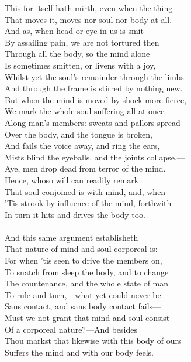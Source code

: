 This for itself hath mirth, even when the thing\\
That moves it, moves nor soul nor body at all.\\
And as, when head or eye in us is smit\\
By assailing pain, we are not tortured then\\
Through all the body, so the mind alone\\
Is sometimes smitten, or livens with a joy,\\
Whilst yet the soul's remainder through the limbs\\
And through the frame is stirred by nothing new.\\
But when the mind is moved by shock more fierce,\\
We mark the whole soul suffering all at once\\
Along man's members: sweats and pallors spread\\
Over the body, and the tongue is broken,\\
And fails the voice away, and ring the ears,\\
Mists blind the eyeballs, and the joints collapse,—\\
Aye, men drop dead from terror of the mind.\\
Hence, whoso will can readily remark\\
That soul conjoined is with mind, and, when\\
'Tis strook by influence of the mind, forthwith\\
In turn it hits and drives the body too.\\
\\
And this same argument establisheth\\
That nature of mind and soul corporeal is:\\
For when 'tis seen to drive the members on,\\
To snatch from sleep the body, and to change\\
The countenance, and the whole state of man\\
To rule and turn,—what yet could never be\\
Sans contact, and sans body contact fails—\\
Must we not grant that mind and soul consist\\
Of a corporeal nature?—And besides\\
Thou markst that likewise with this body of ours\\
Suffers the mind and with our body feels.\\
